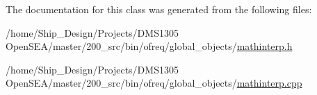 The documentation for this class was generated from the following files\-:\begin{DoxyCompactItemize}
\item 
/home/\-Ship\-\_\-\-Design/\-Projects/\-D\-M\-S1305 Open\-S\-E\-A/master/200\-\_\-src/bin/ofreq/global\-\_\-objects/\hyperlink{mathinterp_8h}{mathinterp.\-h}\item 
/home/\-Ship\-\_\-\-Design/\-Projects/\-D\-M\-S1305 Open\-S\-E\-A/master/200\-\_\-src/bin/ofreq/global\-\_\-objects/\hyperlink{mathinterp_8cpp}{mathinterp.\-cpp}\end{DoxyCompactItemize}
